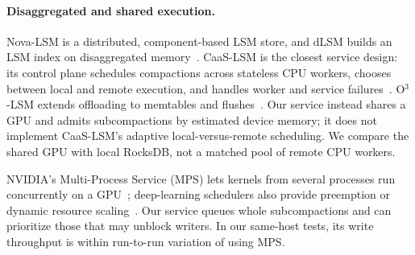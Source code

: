 \documentclass[sigconf, nonacm]{acmart}
\begin{document}
\paragraph{Disaggregated and shared execution.}
Nova-LSM is a distributed, component-based LSM store, and dLSM builds an LSM index on
disaggregated memory~\cite{novalsm2021,dlsm2023}. CaaS-LSM is the closest service design:
its control plane schedules compactions across stateless CPU workers, chooses between
local and remote execution, and handles worker and service failures~\cite{caaslsm2024}.
O$^3$-LSM extends offloading to memtables and flushes~\cite{o3lsm2026}. Our service
instead shares a GPU and admits subcompactions by estimated device memory; it does not
implement CaaS-LSM's adaptive local-versus-remote scheduling. We compare the shared GPU
with local RocksDB, not a matched pool of remote CPU workers.

NVIDIA's Multi-Process Service (MPS) lets kernels from several processes run concurrently
on a GPU~\cite{cudamps}; deep-learning schedulers also provide preemption or dynamic
resource scaling~\cite{reef2022,antman2020}. Our service queues whole subcompactions and
can prioritize those that may unblock writers. In our same-host tests, its write
throughput is within run-to-run variation of using MPS.
\end{document}
